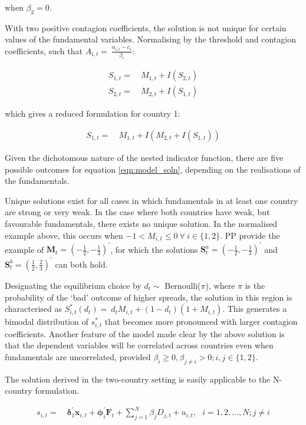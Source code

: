 \documentclass[../base.tex]{subfiles}
\begin{document}
when $\beta_2 = 0$. 

With two positive contagion coefficients, the solution is not unique for certain values of the fundamental variables. Normalising by the threshold and contagion coefficients, such that $A_{i,t} =~\frac{a_{i,t} - c_i}{\beta_i}$:

\begin{align*}
	S_{1,t} =&~ M_{1,t} + I(S_{2,t})\\
	S_{2,t} =&~ M_{2,t} + I(S_{1,t})
\end{align*}

which gives a reduced formulation for country 1:

\begin{align}
	S_{1,t} =&~ M_{1,t} + I(M_{2,t} + I(S_{1,t}))
	\label{eqn:model_soln}
\end{align}

Given the dichotomous nature of the nested indicator function, there are five possible outcomes for equation \ref{eqn:model_soln}, depending on the realisations of the fundamentals. 

Unique solutions exist for all cases in which fundamentals in at least one country are strong or very weak. In the case where both countries have weak, but favourable fundamentals, there exists no unique solution. In the normalised example above, this occurs when $-1 < M_{i,t} \leq 0~\forall~i \in \{1,2\}$. PP provide the example of $\mathbf{M}_t = (-\frac{1}{2}, -\frac{1}{3})^\prime$, for which the solutions $\mathbf{S}_t^a = (-\frac{1}{2}, -\frac{1}{3})^\prime$ and $\mathbf{S}_t^b = (\frac{1}{2}, \frac{2}{3})^\prime$ can both hold.

Designating the equilibrium choice by $d_t \sim$ Bernoulli($\pi$), where $\pi$ is the probability of the `bad' outcome of higher spreads, the solution in this region is characterised as $S_{i,t}^*(d_t) =~d_tM_{i,t} + (1 - d_t)(1 + M_{i,t})$. This generates a bimodal distribution of $s_{i,t}^*$ that becomes more pronounced with larger contagion coefficients. Another feature of the model made clear by the above solution is that the dependent variables will be correlated across countries even when fundamentals are uncorrelated, provided $\beta_i \geq 0, \beta_{j \neq i} > 0; i,j \in \{1, 2\}$. 

The solution derived in the two-country setting is easily applicable to the N-country formulation. 

\begin{align}
	s_{i,t} =&~\mathbf{\delta}_1^{\prime} \mathbf{x}_{i,t} + \mathbf{\phi}_i^{\prime} \mathbf{F}_t + \sum_{j=1}^{N}\beta_j D_{j,t} + u_{i,t}, ~~~ i = 1,2,...,N ; j \neq i
	\label{eqn:pp_multi}	
\end{align}
\end{document}
